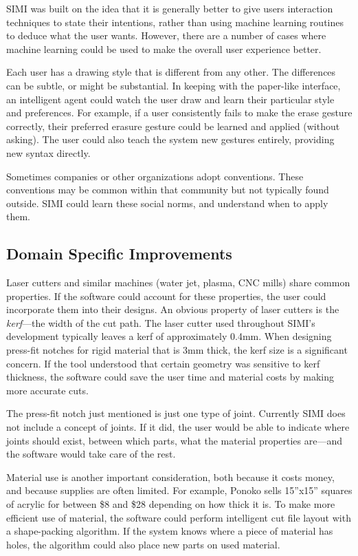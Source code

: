 SIMI was built on the idea that it is generally better to give users
interaction techniques to state their intentions, rather than using
machine learning routines to deduce what the user wants. However,
there are a number of cases where machine learning could be used to
make the overall user experience better.

Each user has a drawing style that is different from any other. The
differences can be subtle, or might be substantial. In keeping with
the paper-like interface, an intelligent agent could watch the user
draw and learn their particular style and preferences. For example, if
a user consistently fails to make the erase gesture correctly, their
preferred erasure gesture could be learned and applied (without
asking). The user could also teach the system new gestures entirely,
providing new syntax directly.

Sometimes companies or other organizations adopt conventions. These
conventions may be common within that community but not typically
found outside. SIMI could learn these social norms, and understand
when to apply them.

\subsection{Domain Specific Improvements}

Laser cutters and similar machines (water jet, plasma, CNC mills)
share common properties. If the software could account for these
properties, the user could incorporate them into their designs. An
obvious property of laser cutters is the \textit{kerf}---the width of
the cut path. The laser cutter used throughout SIMI's development
typically leaves a kerf of approximately 0.4mm. When designing
press-fit notches for rigid material that is 3mm thick, the kerf size
is a significant concern. If the tool understood that certain geometry
was sensitive to kerf thickness, the software could save the user time
and material costs by making more accurate cuts.

The press-fit notch just mentioned is just one type of
joint. Currently SIMI does not include a concept of joints. If it did,
the user would be able to indicate where joints should exist, between
which parts, what the material properties are---and the software would
take care of the rest.

Material use is another important consideration, both because it costs
money, and because supplies are often limited. For example, Ponoko
sells 15''x15'' squares of acrylic for between \$8 and \$28 depending
on how thick it is. To make more efficient use of material, the
software could perform intelligent cut file layout with a shape-packing
algorithm. If the system knows where a piece of material has holes,
the algorithm could also place new parts on used material.

